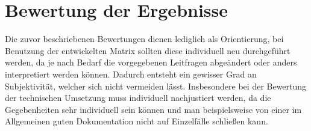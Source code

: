 \chapter{Bewertung der Ergebnisse}

Die zuvor beschriebenen Bewertungen dienen lediglich als Orientierung, 
bei Benutzung der entwickelten Matrix sollten diese individuell neu durchgeführt werden,
da je nach Bedarf die vorgegebenen Leitfragen abgeändert oder anders interpretiert werden können.
Dadurch entsteht ein gewisser Grad an Subjektivität, welcher sich nicht vermeiden lässt.
Insbesondere bei der Bewertung der technischen Umsetzung muss individuell nachjustiert werden,
da die Gegebenheiten sehr individuell sein können und man beispielsweise von einer im Allgemeinen guten Dokumentation nicht auf Einzelfälle schließen kann.
